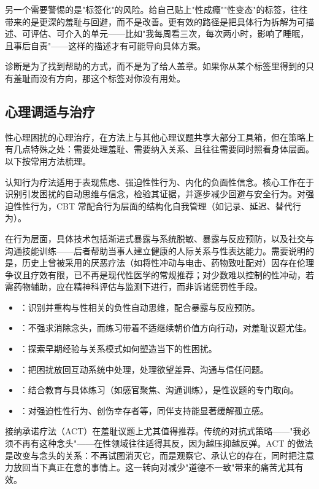 另一个需要警惕的是"标签化"的风险。给自己贴上"性成瘾""性变态"的标签，往往带来的是更深的羞耻与回避，而不是改善。更有效的路径是把具体行为拆解为可描述、可评估、可介入的单元——比如"我每周看三次，每次两小时，影响了睡眠，且事后自责"——这样的描述才有可能导向具体方案。

\begin{tcolorbox}[colback=pink!5!white,colframe=red!50!black,title=贴心小叮咛]
诊断是为了找到帮助的方式，而不是为了给人盖章。如果你从某个标签里得到的只有羞耻而没有方向，那这个标签对你没有用处。
\end{tcolorbox}
\subsection{心理调适与治疗}

性心理困扰的心理治疗，在方法上与其他心理议题共享大部分工具箱，但在策略上有几点特殊之处：需要处理羞耻、需要纳入关系、且往往需要同时照看身体层面。以下按常用方法梳理。

认知行为疗法适用于表现焦虑、强迫性性行为、内化的负面性信念。核心工作在于识别引发困扰的自动思维与信念，检验其证据，并逐步减少回避与安全行为。对强迫性性行为，CBT 常配合行为层面的结构化自我管理（如记录、延迟、替代行为）。

在行为层面，具体技术包括渐进式暴露与系统脱敏、暴露与反应预防，以及社交与沟通技能训练——后者帮助当事人建立健康的人际关系与性表达能力。需要说明的是，历史上曾被采用的厌恶疗法（如将性冲动与电击、药物致吐配对）因存在伦理争议且疗效有限，已不再是现代性医学的常规推荐；对少数难以控制的性冲动，若需药物辅助，应在精神科评估与监测下进行，而非诉诸惩罚性手段。

\begin{itemize}
  \item {}：识别并重构与性相关的负性自动思维，配合暴露与反应预防。
  \item {}：不强求消除念头，而练习带着不适继续朝价值方向行动，对羞耻议题尤佳。
  \item {}：探索早期经验与关系模式如何塑造当下的性困扰。
  \item {}：把困扰放回互动系统中处理，处理欲望差异、沟通与信任问题。
  \item {}：结合教育与具体练习（如感官聚焦、沟通训练），是性议题的专门取向。
  \item {}：对强迫性性行为、创伤幸存者等，同伴支持能显著缓解孤立感。
\end{itemize}

接纳承诺疗法（ACT）在羞耻议题上尤其值得推荐。传统的对抗式策略——"我必须不再有这种念头"——在性领域往往适得其反，因为越压抑越反弹。ACT 的做法是改变与念头的关系：不再试图消灭它，而是观察它、承认它的存在，同时把注意力放回当下真正在意的事情上。这一转向对减少"道德不一致"带来的痛苦尤其有效。

